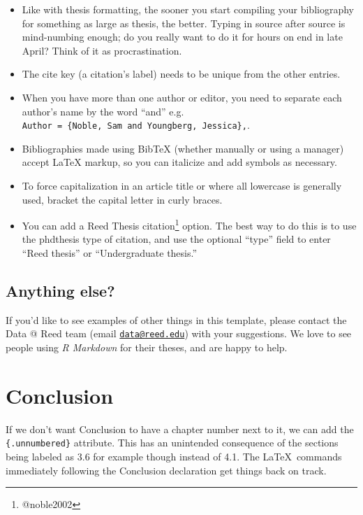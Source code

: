 \documentclass[12pt,twoside]{reedthesis}
\providecommand{\tightlist}{%
  \setlength{\itemsep}{0pt}\setlength{\parskip}{0pt}}
\begin{document}
  \begin{itemize}
  \tightlist
  \item
    Like with thesis formatting, the sooner you start compiling your
    bibliography for something as large as thesis, the better. Typing in
    source after source is mind-numbing enough; do you really want to do
    it for hours on end in late April? Think of it as procrastination.
  \item
    The cite key (a citation's label) needs to be unique from the other
    entries.
  \item
    When you have more than one author or editor, you need to separate
    each author's name by the word ``and'' e.g.
    \texttt{Author\ =\ \{Noble,\ Sam\ and\ Youngberg,\ Jessica\},}.
  \item
    Bibliographies made using BibTeX (whether manually or using a manager)
    accept LaTeX markup, so you can italicize and add symbols as
    necessary.
  \item
    To force capitalization in an article title or where all lowercase is
    generally used, bracket the capital letter in curly braces.
  \item
    You can add a Reed Thesis citation\footnote{@noble2002} option. The
    best way to do this is to use the phdthesis type of citation, and use
    the optional ``type'' field to enter ``Reed thesis'' or
    ``Undergraduate thesis.''
  \end{itemize}
  
  \section{Anything else?}\label{anything-else}
  
  If you'd like to see examples of other things in this template, please
  contact the Data @ Reed team (email
  \href{mailto:data@reed.edu}{\nolinkurl{data@reed.edu}}) with your
  suggestions. We love to see people using \emph{R Markdown} for their
  theses, and are happy to help.
  
  \chapter*{Conclusion}\label{conclusion}
  
  \setcounter{chapter}{4} \setcounter{section}{0}
  
  If we don't want Conclusion to have a chapter number next to it, we can
  add the \texttt{\{.unnumbered\}} attribute. This has an unintended
  consequence of the sections being labeled as 3.6 for example though
  instead of 4.1. The \LaTeX~commands immediately following the Conclusion
  declaration get things back on track.
  
\end{document}
